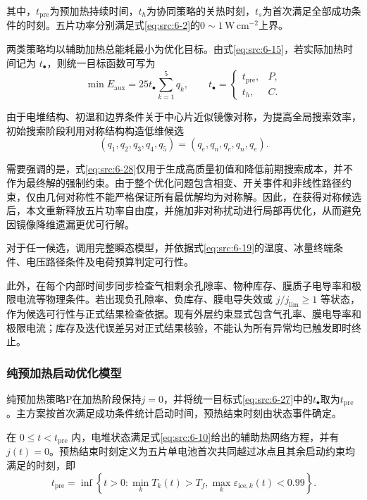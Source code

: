 \documentclass[bwprint]{gmcmthesis}
\numberwithin{equation}{section}
\numberwithin{figure}{section}
\begin{document}
 其中，$t_{\mathrm{pre}}$为预加热持续时间，$t_h$为协同策略的关热时刻，$t_s$为首次满足全部成功条件的时刻。五片功率分别满足式\eqref{eq:src:6-2}的$0\sim1\,\mathrm{W\,cm^{-2}}$上界。

 两类策略均以辅助加热总能耗最小为优化目标。由式\eqref{eq:src:6-15}，若实际加热时间记为 \(t_\bullet\)，则统一目标函数可写为
\begin{equation}
\min E_{\text{aux}} = 25 t_\bullet \sum_{k=1}^5 q_k, \qquad t_\bullet = \begin{cases} t_{\text{pre}}, & P, \\ t_h, & C. \end{cases} \label{eq:src:6-27}
\end{equation}

 由于电堆结构、初温和边界条件关于中心片近似镜像对称，为提高全局搜索效率，初始搜索阶段利用对称结构构造低维候选
\begin{equation}
(q_1, q_2, q_3, q_4, q_5) = (q_e, q_n, q_c, q_n, q_e). \label{eq:src:6-28}
\end{equation}

 需要强调的是，式\eqref{eq:src:6-28}仅用于生成高质量初值和降低前期搜索成本，并不作为最终解的强制约束。由于整个优化问题包含相变、开关事件和非线性路径约束，仅由几何对称性不能严格保证所有最优解均为对称解。因此，在获得对称候选后，本文重新释放五片功率自由度，并施加非对称扰动进行局部再优化，从而避免因镜像降维遗漏更优可行解。

 对于任一候选，调用完整瞬态模型，并依据式\eqref{eq:src:6-19}的温度、冰量终端条件、电压路径条件及电荷预算判定可行性。

 此外，在每个内部时间步同步检查气相剩余孔隙率、物种库存、膜质子电导率和极限电流等物理条件。若出现负孔隙率、负库存、膜电导失效或 \(j/j_{\lim}\ge1\) 等状态，作为候选可行性与正式结果检查依据。现有外层约束显式包含气孔率、膜电导率和极限电流；库存及迭代误差另对正式结果核验，不能认为所有异常均已触发即时终止。
\subsubsection{纯预加热启动优化模型}

 纯预加热策略P在加热阶段保持$j=0$，并将统一目标式\eqref{eq:src:6-27}中的$t_\bullet$取为$t_{\mathrm{pre}}$。主方案按首次满足成功条件统计启动时间，预热结束时刻由状态事件确定。

 在 \(0 \leq t < t_{\text{pre}}\) 内，电堆状态满足式\eqref{eq:src:6-10}给出的辅助热网络方程，并有 \(j(t) = 0\)。预热结束时刻定义为五片单电池首次共同越过冰点且其余启动约束均满足的时刻，即
\begin{equation}
t_{\text{pre}} = \inf \left\{ t > 0 : \min_k T_k(t) > T_f, \max_k \varepsilon_{\text{ice},k}(t) < 0.99 \right\}. \label{eq:src:6-31}
\end{equation}
\end{document}
